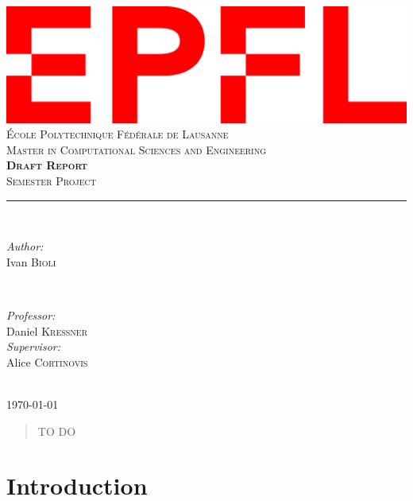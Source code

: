 \documentclass[11pt, a4paper]{report}
\begin{document}
\begin{titlepage}
	\centering
    \includegraphics[width=0.4\linewidth]{epfl.png}\\[0.5cm] 	%
    \textsc{\LARGE École Polytechnique Fédérale de Lausanne}\\
    [0.7 cm]
    \textsc{\LARGE Master in Computational Sciences and Engineering}\\
    \vspace{\fill}
    \textbf{\textsc{\fontsize{50}{50}\selectfont Draft Report}}\\ \vspace{\fill}		
	\textsc{\LARGE Semester Project}\\[0.4cm]
	\rule{\linewidth}{0.2 mm} \\[0.5 cm]
	\begin{minipage}{0.4\textwidth}
    \begin{flushleft} \large
    \emph{Author:}\\
    Ivan \textsc{Bioli} %
    \end{flushleft}
    \end{minipage}
    ~
    \begin{minipage}{0.4\textwidth}
    \begin{flushright} \large
    \emph{Professor:} \\
    Daniel \textsc{Kressner} \\
    \emph{Supervisor:} \\
    Alice \textsc{Cortinovis} \\
    \end{flushright}
    \end{minipage}\\
	[2cm] \Large{\today}
	
\end{titlepage}
\restoregeometry

\begin{abstract}
\thispagestyle{empty}
TO DO
\end{abstract}

\clearpage
\thispagestyle{empty}
\tableofcontents

\setcounter{page}{1}

\chapter{Introduction}



\nocite{*}
\printbibliography
\end{document}
